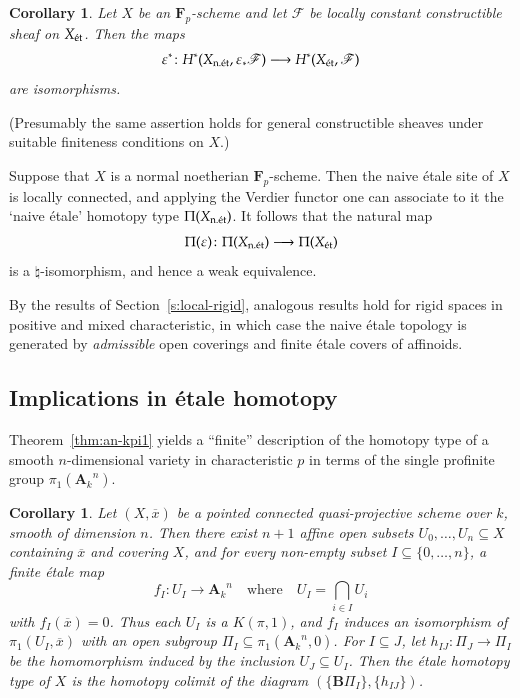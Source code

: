 \documentclass[twoside]{amsart}
\renewcommand{\AA}{\mathbf{A}}
\newcommand{\FF}{\mathbf{F}}
\newcommand{\Ff}{\mathscr{F}}
\newcommand{\et}{{\rm\acute{e}t}}
\newcommand{\ANK}[2]{{\AA_{#2}}^{\! \! \! \!  #1}} %
\newcommand{\AN}[1]{\ANK{#1}{k}}
\renewcommand{\to}{\longrightarrow}
\renewcommand{\bar}{\overline}
\theoremstyle{plain}
\newtheorem{corollary}[subsubsection]{Corollary}
\theoremstyle{definition}
\theoremstyle{remark}
\numberwithin{equation}{subsection}
\begin{document}
\begin{corollary}
	Let $X$ be an $\FF_p$-scheme and let $\Ff$ be locally constant constructible sheaf on $X_\et$. Then the maps
	\[ 
		\varepsilon^*\colon H^*(X_{{\rm n.}\et}, \varepsilon_*\Ff)\to H^*(X_\et, \Ff)
	\]
	are isomorphisms. 
\end{corollary}

(Presumably the same assertion holds for general constructible sheaves under suitable finiteness conditions on $X$.)

Suppose that $X$ is a normal noetherian $\FF_p$-scheme. Then the naive \'etale site of $X$ is locally connected, and applying the Verdier functor one can associate to it the `naive \'etale' homotopy type $\Pi(X_{{\rm n.}\et})$. It follows that the natural map
\[ 
	\Pi(\varepsilon) \colon \Pi(X_{{\rm n.}\et}) \to \Pi(X_\et)
\]
is a $\natural$-isomorphism, and hence a weak equivalence.

By the results of Section~\ref{s:local-rigid}, analogous results hold for rigid spaces in positive and mixed characteristic, in which case the naive \'etale topology is generated by \emph{admissible} open coverings and finite \'etale covers of affinoids.

\subsection{Implications in \'etale homotopy}

Theorem~\ref{thm:an-kpi1} yields a ``finite'' description of the homotopy type of a smooth $n$-dimensional variety in characteristic $p$ in terms of the single profinite group $\pi_1(\AN n)$.  

\begin{corollary} \label{cor:homotopy}
	Let $(X, \bar x)$ be a pointed connected quasi-projective scheme over $k$, smooth of dimension $n$. Then there exist $n+1$ affine open subsets $U_0, \ldots, U_{n}\subseteq X$ containing $\bar x$ and covering $X$, and for every non-empty subset $I\subseteq \{0, \ldots, n\}$, a finite \'etale map 
	\[ 
		f_I \colon U_I \to \AN{n} \quad\text{where} \quad U_I = \bigcap_{i\in I} U_i
	\]
	with $f_I(\bar x)=0$. Thus each $U_I$ is a $K(\pi, 1)$, and $f_I$ induces an isomorphism of $\pi_1(U_I, \bar x)$ with an open subgroup $\Pi_I\subseteq \pi_1(\AN n, 0)$. For $I\subseteq J$, let $h_{IJ}\colon \Pi_J\to \Pi_I$ be the homomorphism induced by the inclusion $U_J\subseteq U_I$. Then the \'etale homotopy type of $X$ is the homotopy colimit of the diagram $(\{\mathbf{B}\Pi_I\}, \{h_{IJ}\})$.
\end{corollary}
\end{document}
